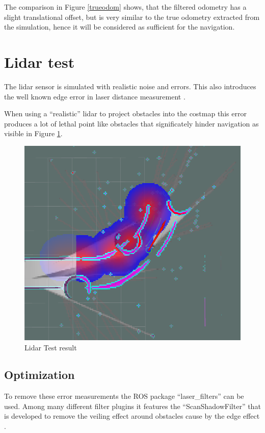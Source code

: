 The comparison in Figure \ref{trueodom} shows, that the filtered odometry has a slight translational offset, but is very similar to the true odometry extracted from the simulation, hence it will be considered as sufficient for the navigation.


\section{Lidar test}


The lidar sensor is simulated with realistic noise and errors. This also introduces the well known edge error in laser distance measurement \cite{edgeeffect}. 

When using a ``realistic'' lidar to project obstacles into the costmap this error produces a lot of lethal point like obstacles that significately hinder navigation as visible in Figure \ref{unfiltered lidar}.

\begin{figure}[H]
	\includegraphics[width=\textwidth]{Pictures/Needs filtering of Laser}
	\caption{Lidar Test result}
	\label{unfiltered lidar}
\end{figure}

\subsection{Optimization}
To remove these error measurements the ROS package ``laser\_filters'' can be used. Among many different filter plugins it features the ``ScanShadowFilter'' that is developed to remove the veiling effect around obstacles cause by the edge effect \cite{laserfilters}.


